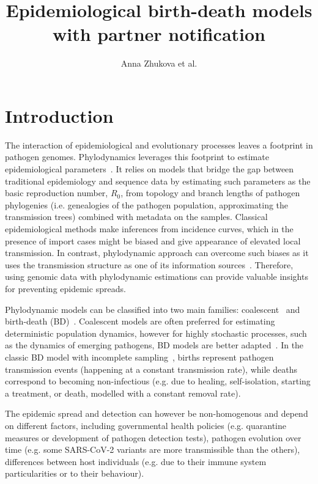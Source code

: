 \documentclass[a4paper,10pt]{article}
\title{Epidemiological birth-death models with partner notification}
\author{Anna Zhukova et al.}
\begin{document}
\maketitle

%

\section{Introduction}
The interaction of epidemiological and evolutionary processes leaves a footprint in pathogen genomes. Phylodynamics leverages this footprint to estimate epidemiological parameters~\citep{Grenfell2004a,Volz2013}. It relies on models that bridge the gap between traditional epidemiology and sequence data by estimating such parameters as the basic reproduction number, $R_0$, from topology and branch lengths of pathogen phylogenies (i.e. genealogies of the pathogen population, approximating the transmission trees) combined with metadata on the samples. Classical epidemiological methods make inferences from incidence curves, which in the presence of import cases might be biased and give appearance of elevated local transmission. In contrast, phylodynamic approach can overcome such biases as it uses the transmission structure as one of its information sources~\citep{vaughanEstimatesEarlyOutbreakspecific2024}. Therefore, using genomic data with phylodynamic estimations can provide valuable insights for preventing epidemic spreads.


Phylodynamic models can be classified into two main families:  coalescent~\citep{Volz2009a,Drummond2005,Pybus2000a} and birth-death (BD)~\citep{Kendall1948,Maddison2007,Stadler2009,Stadler2010}. Coalescent models are often preferred for estimating deterministic population dynamics, however for highly stochastic processes, such as the dynamics of emerging pathogens, BD models are better adapted~\citep{Macpherson2021}. In the classic BD model with incomplete sampling~\citep{Stadler2009}, births represent pathogen transmission events (happening at a constant transmission rate), while deaths correspond to becoming non-infectious (e.g. due to healing, self-isolation, starting a treatment, or death, modelled with a constant removal rate). 

The epidemic spread and detection can however be non-homogenous and depend on different factors, including governmental health policies (e.g. quarantine measures or development of pathogen detection tests), pathogen evolution over time (e.g. some SARS-CoV-2 variants are more transmissible than the others),  differences between host individuals (e.g. due to their immune system particularities or to their behaviour).
\end{document}
